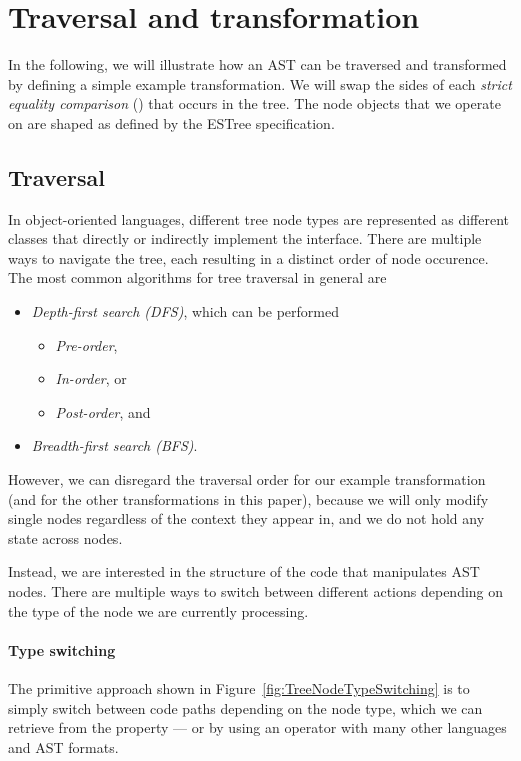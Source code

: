 \section{Traversal and transformation}
In the following, we will illustrate
how an AST can be traversed and transformed
by defining a simple example transformation.
We will swap the sides of each
\textit{strict equality comparison} (\code{===})
that occurs in the tree.
The node objects that we operate on
are shaped as defined by the ESTree specification.

\subsection{Traversal}
In object-oriented languages,
different tree node types are represented as
different classes that directly or indirectly
implement the  interface.
There are multiple ways to navigate the tree,
each resulting in a distinct order of node occurence.
The most common algorithms for tree traversal in general are
\begin{itemize}
  \item \textit{Depth-first search (DFS)},
  which can be performed
  \begin{itemize}
    \item \textit{Pre-order},
    \item \textit{In-order}, or
    \item \textit{Post-order}, and
  \end{itemize}
  \item \textit{Breadth-first search (BFS)}.
\end{itemize}
However, we can disregard the traversal order
for our example transformation
(and for the other transformations in this paper),
because we will only modify single nodes
regardless of the context they appear in,
and we do not hold any state across nodes.

Instead, we are interested in the structure of
the code that manipulates AST nodes.
There are multiple ways to switch between
different actions depending on the
type of the node we are currently processing.

\paragraph{Type switching}
The primitive approach shown in Figure~\ref{fig:TreeNodeTypeSwitching}
is to simply switch between code paths depending on the node type,
which we can retrieve from the  property
--- or by using an  operator
with many other languages and AST formats.


